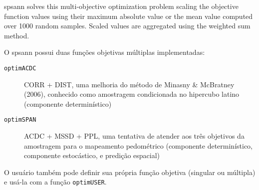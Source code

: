 spsann solves this multi-objective optimization problem scaling the objective function values using their maximum absolute value or the mean value computed over 1000 random samples. Scaled values are aggregated using the weighted sum method.

O spsann possui duas funções objetivas múltiplas implementadas:

\begin{description}
\item [\verb|optimACDC|] CORR + DIST, uma melhoria do método de Minasny & McBratney (2006), conhecido como amostragem condicionada no hipercubo latino (componente determinístico)
\item [\verb|optimSPAN|] ACDC + MSSD + PPL, uma tentativa de atender aos três objetivos da amostragem para o mapeamento pedométrico (componente determinístico, componente estocástico, e predição espacial)
\end{description}

O usuário também pode definir sua própria função objetiva (singular ou múltipla) e usá-la com a função \verb|optimUSER|.